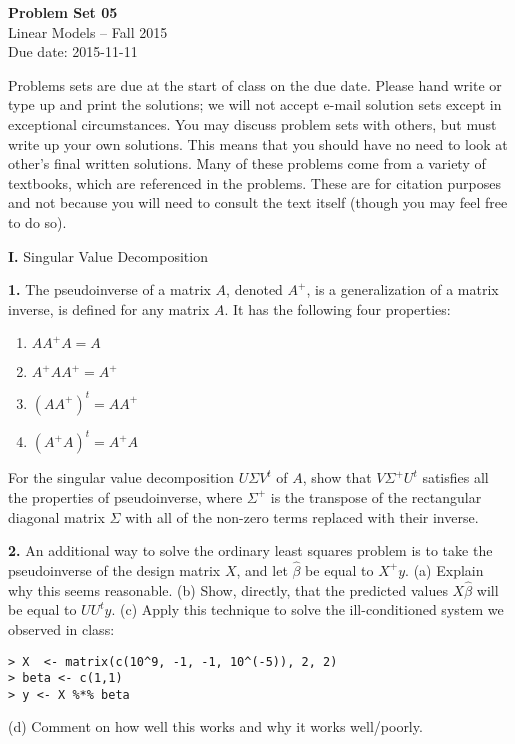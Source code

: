 \documentclass[12pt]{article}
\begin{document}
\begin{center}
{\bf Problem Set 05} \\
Linear Models -- Fall 2015 \\
Due date: 2015-11-11
\end{center}

\medskip

Problems sets are due at the start of class on the due date. Please hand write
or type up and print the solutions; we will not accept e-mail solution sets except
in exceptional circumstances. You may discuss problem sets with others, but must
write up your own solutions. This means that you should have no need to look at other's
final written solutions. Many of these problems come from a variety of textbooks,
which are referenced in the problems. These are for citation purposes and not because
you will need to consult the text itself (though you may feel free to do so).

\medskip

{\bf I.} Singular Value Decomposition

{\bf 1.} The pseudoinverse of a matrix $A$, denoted $A^{+}$, is a generalization of
a matrix inverse, is defined for any matrix $A$. It has the following four properties:
\begin{enumerate}
\item $A A^{+} A = A$
\item $A^{+} A A^{+} = A^{+}$
\item $(A A^{+})^{t} = A A^{+}$
\item $(A^{+} A)^{t} = A^{+} A$
\end{enumerate}
For the singular value decomposition $U \Sigma V^t$ of $A$, show that $V \Sigma^{+} U^t$
satisfies all the properties of pseudoinverse, where $\Sigma^{+}$ is the transpose of the
rectangular diagonal matrix $\Sigma$ with all of the non-zero terms replaced with their
inverse.

{\bf 2.} An additional way to solve the ordinary least squares problem is to take the
pseudoinverse of the design matrix $X$, and let $\widehat{\beta}$ be equal to $X^{+} y$.
(a) Explain why this seems reasonable.  (b) Show, directly, that
the predicted values $X\widehat{\beta}$ will be equal to $UU^t y$.
(c) Apply this technique to solve the ill-conditioned system we observed in class:
\begin{verbatim}
> X  <- matrix(c(10^9, -1, -1, 10^(-5)), 2, 2)
> beta <- c(1,1)
> y <- X %*% beta
\end{verbatim}
(d) Comment on how well this works and why it works well/poorly.
\end{document}
